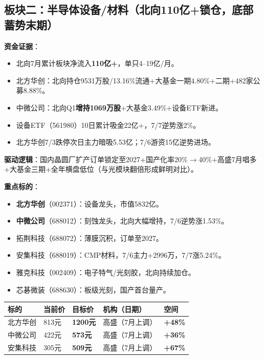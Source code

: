 \documentclass[a4paper,11pt,fontset=none]{ctexart}
\begin{document}
\subsection*{板块二：半导体设备/材料（北向110亿+锁仓，底部蓄势末期）}

\textbf{资金证据}：
\begin{itemize}
  \item 北向7月累计板块净流入\textbf{110亿+}，单只4--19亿/月。
  \item 北方华创：北向持仓9531万股/13.16\%流通+大基金一期4.80\%+二期+482家公募8.88\%。
  \item 中微公司：北向Q1\textbf{增持1069万股}+大基金3.49\%+设备ETF新进。
  \item 设备ETF（561980）10日累计吸金22亿+，7/7逆势涨2\%。
  \item 北方华创7/3跌停次日主力暗吸5.53亿；7/6游资15亿逆势进场。
\end{itemize}

\textbf{驱动逻辑}：国内晶圆厂扩产订单锁定至2027+国产化率20\%$\to$40\%+高盛7月唱多+大基金三期+全年横盘低位（与光模块翻倍形成鲜明对比）。

\textbf{重点标的}：
\begin{itemize}
  \item \textbf{北方华创}（002371）：设备龙头，市值5832亿。
  \item \textbf{中微公司}（688012）：刻蚀龙头，北向大幅增持，7/6逆势涨1.53\%。
  \item 拓荆科技（688072）：薄膜沉积，订单至2027。
  \item 安集科技（688019）：CMP材料，7/6主力+2996万，7/7涨5.24\%。
  \item 雅克科技（002409）：电子特气/光刻胶，北向持续加仓。
  \item 芯碁微装（688630）：板级光刻，国产首台量产。
\end{itemize}

\begin{tabularx}{\textwidth}{L{2.5cm}L{2cm}L{2cm}L{3.5cm}X}
\toprule
\textbf{标的} & \textbf{当前价} & \textbf{目标价} & \textbf{机构（日期）} & \textbf{空间} \\
\midrule
北方华创 & 813元 & \textbf{1200元} & 高盛（7月上调） & \textbf{+48\%} \\
中微公司 & 422元 & \textbf{573元} & 高盛（7月上调） & \textbf{+36\%} \\
安集科技 & 305元 & \textbf{509元} & 高盛（7月上调） & \textbf{+67\%} \\
\bottomrule
\end{tabularx}
\end{document}

